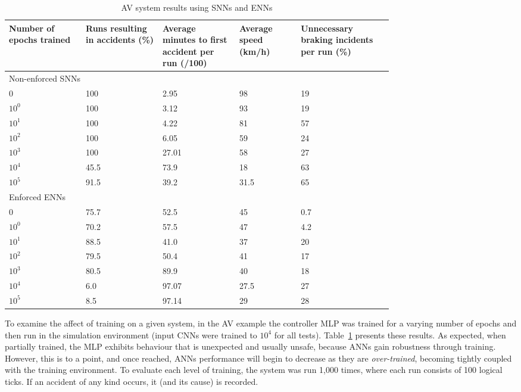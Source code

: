 \begin{table}[htb]
	\centering
        \scriptsize{
	\caption{AV system results using \acp{SNN} and \acp{ENN}}
	\label{table:avenf}
	\begin{tabular}{|p{0.15\linewidth}|p{0.15\linewidth}|p{0.15\linewidth}|p{0.12\linewidth}|p{0.18\linewidth}|}
		\hline Number of epochs trained & Runs resulting in accidents (\%) & Average minutes to first accident per run (/100) & Average speed (km/h) & Unnecessary braking incidents per run (\%) \\ \hline
		\multicolumn{5}{|p{0.75\linewidth}|}{Non-enforced \acp{SNN}} \\ \hline
		0 & 100	 & 2.95 & 98 & 19 \\ \hline
		$10^0$ & 100 & 3.12 & 93 & 19 \\ \hline
		$10^1$ & 100 & 4.22 & 81 & 57 \\ \hline
		$10^2$ & 100 & 6.05 & 59 & 24 \\ \hline
		$10^3$ & 100 & 27.01 & 58 & 27 \\  \hline
		$10^4$ & 45.5 & 73.9 & 18 & 63 \\ \hline
		$10^5$ & 91.5 & 39.2 & 31.5 & 65 \\ \hline 
		\multicolumn{5}{|p{0.75\linewidth}|}{Enforced \acp{ENN}} \\ \hline
		0 & 75.7 & 52.5 & 45 & 0.7 \\ \hline 
		$10^0$ & 70.2 & 57.5 & 47 & 4.2 \\ \hline 
		$10^1$ & 88.5 & 41.0 & 37 & 20 \\ \hline 
		$10^2$ & 79.5 & 50.4 & 41 & 17 \\ \hline 
		$10^3$ & 80.5 & 89.9 & 40 & 18 \\ \hline 
		$10^4$ & 6.0 & 97.07 & 27.5 & 27 \\ \hline   
		$10^5$ & 8.5 & 97.14 & 29 & 28 \\ \hline                  
	\end{tabular}}
\end{table}

To examine the affect of training on a given system, in the \ac{AV} example the controller \ac{MLP} was trained for a varying number of epochs
 and then run in the simulation environment (input \acp{CNN} were trained to $10^4$ for all tests).
Table~\ref{table:avenf} presents these results.
As expected, when partially trained, the \ac{MLP} exhibits behaviour that is unexpected and usually unsafe, because \acp{ANN} gain robustness through training.
However, this is to a point, and once reached, \acp{ANN} performance will begin to decrease as they are \emph{over-trained}, becoming tightly coupled with the training environment.
To evaluate each level of training, the system was run 1,000 times, where each run consists of 100 logical ticks.
If an accident of any kind occurs, it (and its cause) is recorded.


